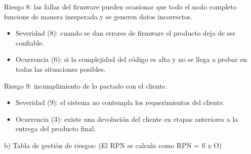 \documentclass[
11pt, %
]{charter}
\begin{document}
Riesgo 8: las fallas del firmware pueden ocasionar que todo el nodo completo funcione de manera inesperada y se generen datos incorrectos.
\begin{itemize}
	\item Severidad (8): cuando se dan errores de firmware el producto deja de ser confiable.
	\item Ocurrencia (6): si la complejidad del código es alta y no se llega a probar en todas las situaciones posibles.
\end{itemize}

Riesgo 9: incumplimiento de lo pactado con el cliente.
\begin{itemize}
	\item Severidad (9): el sistema no contempla los requerimientos del cliente.
	\item Ocurrencia (3): existe una devolución del cliente en etapas anteriores a la entrega del producto final.
\end{itemize}


b) Tabla de gestión de riesgos:      (El RPN se calcula como RPN = S x O)

\end{document}
